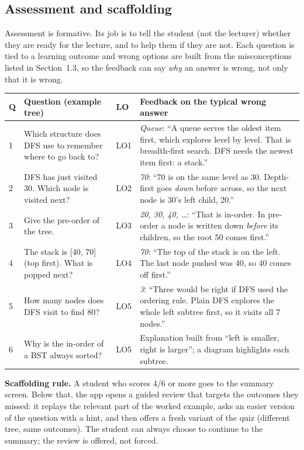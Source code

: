 \documentclass[11pt,a4paper]{article}
\begin{document}
\subsection{Assessment and scaffolding}

Assessment is formative. Its job is to tell the student (not the lecturer) whether they are ready
for the lecture, and to help them if they are not. Each question is tied to a learning outcome
and wrong options are built from the misconceptions listed in Section~1.3, so the feedback can say
\emph{why} an answer is wrong, not only that it is wrong.

\begin{longtable}{@{}p{0.6cm} p{5.4cm} p{1.4cm} p{7.4cm}@{}}
  \toprule
  \textbf{Q} & \textbf{Question (example tree)} & \textbf{LO} & \textbf{Feedback on the typical wrong answer} \\
  \midrule
  \endhead
  1 & Which structure does DFS use to remember where to go back to? & LO1 &
      \emph{Queue}: ``A queue serves the oldest item first, which explores level by level.
      That is breadth-first search. DFS needs the newest item first: a stack.'' \\
  2 & DFS has just visited 30. Which node is visited next? & LO2 &
      \emph{70}: ``70 is on the same level as 30. Depth-first goes \emph{down} before across, so the
      next node is 30's left child, 20.'' \\
  3 & Give the pre-order of the tree. & LO3 &
      \emph{20, 30, 40, \ldots}: ``That is in-order. In pre-order a node is written down
      \emph{before} its children, so the root 50 comes first.'' \\
  4 & The stack is [40, 70] (top first). What is popped next? & LO4 &
      \emph{70}: ``The top of the stack is on the left. The last node pushed was 40, so 40 comes off first.'' \\
  5 & How many nodes does DFS visit to find 80? & LO5 &
      \emph{3}: ``Three would be right if DFS used the ordering rule. Plain DFS explores the whole
      left subtree first, so it visits all 7 nodes.'' \\
  6 & Why is the in-order of a BST always sorted? & LO5 &
      Explanation built from ``left is smaller, right is larger''; a diagram highlights each subtree. \\
  \bottomrule
\end{longtable}

\textbf{Scaffolding rule.} A student who scores 4/6 or more goes to the summary screen. Below
that, the app opens a guided review that targets the outcomes they missed: it replays the
relevant part of the worked example, asks an easier version of the question with a hint, and
then offers a fresh variant of the quiz (different tree, same outcomes). The student can always
choose to continue to the summary; the review is offered, not forced.
\end{document}
